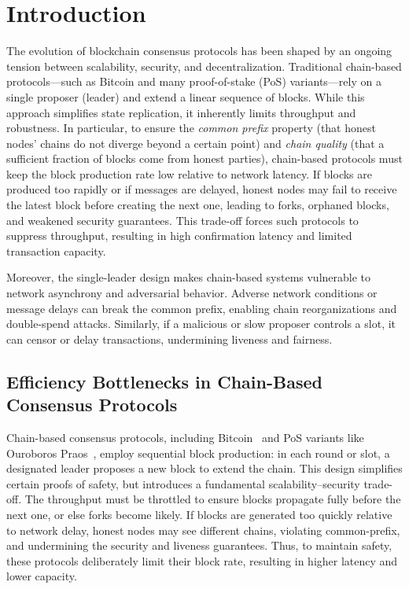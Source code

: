 \documentclass[11pt]{article}
\begin{document}
\section{Introduction}
\label{sec:intro}

The evolution of blockchain consensus protocols has been shaped by an ongoing tension between scalability, security, and decentralization. Traditional chain-based protocols---such as Bitcoin and many proof-of-stake (PoS) variants---rely on a single proposer (leader) and extend a linear sequence of blocks. While this approach simplifies state replication, it inherently limits throughput and robustness. In particular, to ensure the {\em common prefix} property (that honest nodes' chains do not diverge beyond a certain point) and {\em chain quality} (that a sufficient fraction of blocks come from honest parties), chain-based protocols must keep the block production rate low relative to network latency. If blocks are produced too rapidly or if messages are delayed, honest nodes may fail to receive the latest block before creating the next one, leading to forks, orphaned blocks, and weakened security guarantees. This trade-off forces such protocols to suppress throughput, resulting in high confirmation latency and limited transaction capacity.

Moreover, the single-leader design makes chain-based systems vulnerable to network asynchrony and adversarial behavior. Adverse network conditions or message delays can break the common prefix, enabling chain reorganizations and double-spend attacks. Similarly, if a malicious or slow proposer controls a slot, it can censor or delay transactions, undermining liveness and fairness.

\subsection{Efficiency Bottlenecks in Chain-Based Consensus Protocols}
Chain-based consensus protocols, including Bitcoin~\cite{Bitcoin} and PoS variants like Ouroboros Praos~\cite{EC:DGKR18}, employ sequential block production: in each round or slot, a designated leader proposes a new block to extend the chain. This design simplifies certain proofs of safety, but introduces a fundamental scalability–security trade-off. The throughput must be throttled to ensure blocks propagate fully before the next one, or else forks become likely. If blocks are generated too quickly relative to network delay, honest nodes may see different chains, violating common-prefix, and undermining the security and liveness guarantees. Thus, to maintain safety, these protocols deliberately limit their block rate, resulting in higher latency and lower capacity.
\end{document}
